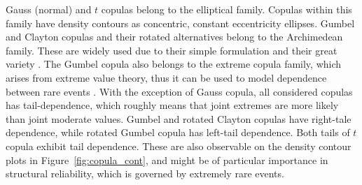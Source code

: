 Gauss (normal) and $t$ copulas belong to the elliptical family. Copulas within this family have density contours as concentric, constant eccentricity ellipses. Gumbel and Clayton copulas and their rotated alternatives belong to the Archimedean family. These are widely used due to their simple formulation and their great variety \citep{Nelson2006}. The Gumbel copula also belongs to the extreme copula family, which arises from extreme value theory, thus it can be used to model dependence between rare events \citep{Joe1997}. With the exception of Gauss copula, all considered copulas has tail-dependence, which roughly means that joint extremes are more likely than joint moderate values. Gumbel and rotated Clayton copulas have right-tale dependence, while rotated Gumbel copula has left-tail dependence. Both tails of $t$ copula exhibit tail dependence. These are also observable on the density contour plots in Figure~\ref{fig:copula_cont}, and might be of particular importance in structural reliability, which is governed by extremely rare events.

